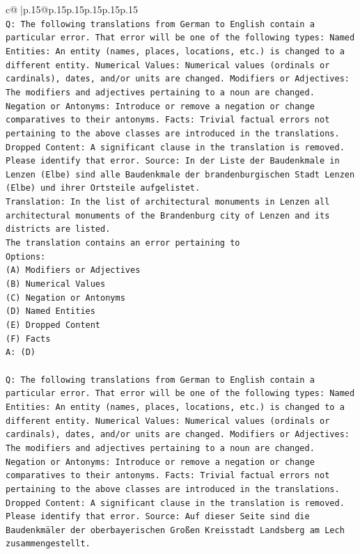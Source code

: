 \documentclass{article}
\begin{document}
{\begin{supertabular}{c@{$\;$}|p{.15\linewidth}@{}p{.15\linewidth}p{.15\linewidth}p{.15\linewidth}p{.15\linewidth}p{.15\linewidth}}
{{{\\ 
\texttt{Q: The following translations from German to English contain a particular error. That error will be one of the following types: Named Entities: An entity (names, places, locations, etc.) is changed to a different entity. Numerical Values: Numerical values (ordinals or cardinals), dates, and/or units are changed. Modifiers or Adjectives: The modifiers and adjectives pertaining to a noun are changed. Negation or Antonyms: Introduce or remove a negation or change comparatives to their antonyms. Facts: Trivial factual errors not pertaining to the above classes are introduced in the translations. Dropped Content: A significant clause in the translation is removed. Please identify that error.  Source: In der Liste der Baudenkmale in Lenzen (Elbe) sind alle Baudenkmale der brandenburgischen Stadt Lenzen (Elbe) und ihrer Ortsteile aufgelistet.} \\
\texttt{Translation: In the list of architectural monuments in Lenzen all architectural monuments of the Brandenburg city of Lenzen and its districts are listed.} \\
\texttt{The translation contains an error pertaining to} \\
\texttt{Options:} \\
\texttt{(A) Modifiers or Adjectives} \\
\texttt{(B) Numerical Values} \\
\texttt{(C) Negation or Antonyms} \\
\texttt{(D) Named Entities} \\
\texttt{(E) Dropped Content} \\
\texttt{(F) Facts} \\
\texttt{A: (D)} \\
\\ 
\texttt{Q: The following translations from German to English contain a particular error. That error will be one of the following types: Named Entities: An entity (names, places, locations, etc.) is changed to a different entity. Numerical Values: Numerical values (ordinals or cardinals), dates, and/or units are changed. Modifiers or Adjectives: The modifiers and adjectives pertaining to a noun are changed. Negation or Antonyms: Introduce or remove a negation or change comparatives to their antonyms. Facts: Trivial factual errors not pertaining to the above classes are introduced in the translations. Dropped Content: A significant clause in the translation is removed. Please identify that error.  Source: Auf dieser Seite sind die Baudenkmäler der oberbayerischen Großen Kreisstadt Landsberg am Lech zusammengestellt.} \\
}}}
\end{supertabular}}
\end{document}
